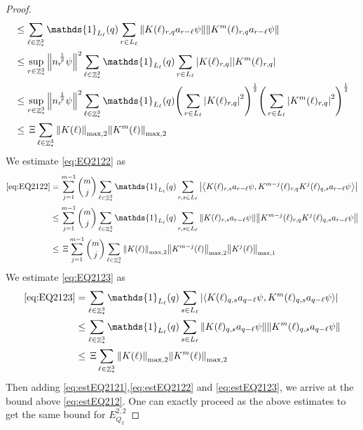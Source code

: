 \documentclass[sn-mathphys, Numbered ,a4paper]{sn-jnl}%
\DeclareMathOperator{\Z}{\mathbb{Z}}
\newcommand{\half}{\frac{1}{2}}
\newcommand{\eva}[1]{\left\langle #1 \right\rangle}
\theoremstyle{plain}
\theoremstyle{definition}
\theoremstyle{remark}
\theoremstyle{plain}
\theoremstyle{definition}
\theoremstyle{remark}
\begin{document}
\begin{proof}
\begin{align}
    &\leq \sum\limits_{\ell \in \Z^3_*} \mathds{1}_{L_{\ell}}(q) \sum\limits_{r\in L_{\ell}} \norm{ K(\ell)_{r,q} a_{r-\ell} \psi}\norm{ K^m(\ell)_{r,q}  a_{r-\ell} \psi }\nonumber\\
	&\leq \sup\limits_{r\in \Z^3_*} \norm{n_r^{\,\half}\psi}^2 \sum\limits_{\ell \in \Z^3_*} \mathds{1}_{L_{\ell}}(q) \sum\limits_{r\in L_{\ell}} \abs{ K(\ell)_{r,q} } \abs{ K^m(\ell)_{r,q} }\nonumber\\
	&\leq \sup\limits_{r\in \Z^3_*} \norm{n_r^{\,\half}\psi}^2 \sum\limits_{\ell \in \Z^3_*} \mathds{1}_{L_{\ell}}(q) \Bigg(\sum\limits_{r\in L_{\ell}} \abs{ K(\ell)_{r,q} }^2\Bigg)^\half \Bigg(\sum\limits_{r\in L_{\ell}}\abs{ K^m(\ell)_{r,q} }^2\Bigg)^\half\nonumber\\
    &\leq \, \Xi \sum\limits_{\ell \in \Z^3_*} \norm{K(\ell)}_{\mathrm{max,2}} \norm{K^m(\ell)}_{\mathrm{max,2}}  \label{eq:estEQ2121}
    \end{align}
We estimate \eqref{eq:EQ2122} as
\begin{align}
     \eqref{eq:EQ2122}
    &=\sum\limits_{j=1}^{m-1} {{m}\choose j} \sum\limits_{\ell \in \Z^3_*}\mathds{1}_{L_{\ell}}(q) \sum\limits_{r,s\in L_{\ell}}  \abs{\eva{ K(\ell)_{r,s} a_{r-\ell}\psi, K^{m-j}(\ell)_{r,q} K^{j}(\ell)_{q,s} a_{r-\ell} \psi }}\nonumber\\
    &\leq \sum\limits_{j=1}^{m-1} {{m}\choose j} \sum\limits_{\ell \in \Z^3_*}\mathds{1}_{L_{\ell}}(q) \sum\limits_{r,s\in L_{\ell}}  \norm{ K(\ell)_{r,s} a_{r-\ell}\psi}\norm{ K^{m-j}(\ell)_{r,q} K^{j}(\ell)_{q,s} a_{r-\ell} \psi } \nonumber\\
    &\leq \,\Xi \sum\limits_{j=1}^{m-1} {{m}\choose j}\sum\limits_{\ell \in \Z^3_*} \norm{K(\ell)}_{\mathrm{max,2}} \norm{K^{m-j}(\ell)}_{\mathrm{max,2}} \norm{K^j(\ell)}_{\mathrm{max,1}} \label{eq:estEQ2122}
    \end{align}
    We estimate \eqref{eq:EQ2123} as 
    \begin{align}
    	\eqref{eq:EQ2123}
    	&=\sum\limits_{\ell \in \Z^3_*} \mathds{1}_{L_{\ell}}(q) \sum\limits_{ s \in L_{\ell}} \abs{\eva{K(\ell)_{q,s} a_{q-\ell} \psi, K^m(\ell)_{q,s}  a_{q-\ell} \psi }} \nonumber\\
    	&\leq \sum\limits_{\ell \in \Z^3_*} \mathds{1}_{L_{\ell}}(q) \sum\limits_{ s \in L_{\ell}} \norm{K(\ell)_{q,s} a_{q-\ell} \psi}\norm{ K^m(\ell)_{q,s}  a_{q-\ell} \psi } \nonumber\\
    	&\leq \,\Xi \sum\limits_{\ell \in \Z^3_*} \norm{K(\ell)}_{\mathrm{max,2}} \norm{K^m(\ell)}_{\mathrm{max,2}} \label{eq:estEQ2123}
    \end{align} 
Then adding \eqref{eq:estEQ2121},\eqref{eq:estEQ2122} and \eqref{eq:estEQ2123}, we arrive at the bound above \eqref{eq:estEQ212}. One can exactly proceed as the above estimates to get the same bound for $E_{Q_2}^{2,2}$
\end{proof}
\end{document}
